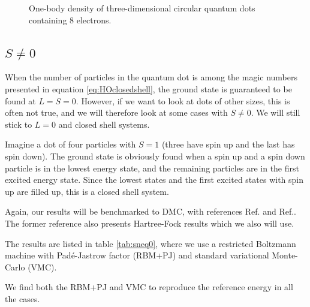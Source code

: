 \begin{figure}[H]
	\centering
	
	\caption{One-body density of three-dimensional circular quantum dots containing 8 electrons.}
	\label{fig:lowfreqOB3D}
\end{figure}

\iffalse
\subsection{$S\neq0$}
When the number of particles in the quantum dot is among the magic numbers presented in equation \eqref{eq:HOclosedshell}, the ground state is guaranteed to be found at $L=S=0$. However, if we want to look at dots of other sizes, this is often not true, and we will therefore look at some cases with $S\neq 0$. We will still stick to $L=0$ and closed shell systems.

Imagine a dot of four particles with $S=1$ (three have spin up and the last has spin down). The ground state is obviously found when a spin up and a spin down particle is in the lowest energy state, and the remaining particles are in the first excited energy state. Since the lowest states and the first excited states with spin up are filled up, this is a closed shell system.

Again, our results will be benchmarked to DMC, with references Ref.\cite{pederiva_diffusion_2000} and Ref.\cite{ghosal_incipient_2007}. The former reference also presents Hartree-Fock results which we also will use. 

The results are listed in table \eqref{tab:sneq0}, where we use a restricted Boltzmann machine with Padé-Jastrow factor (RBM+PJ) and standard variational Monte-Carlo (VMC). 

We find both the RBM+PJ and VMC to reproduce the reference energy in all the cases. 

